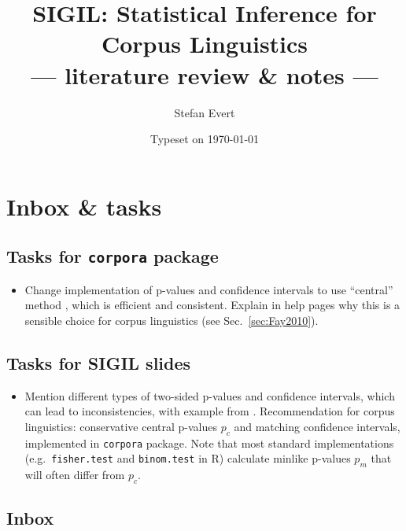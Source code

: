 \documentclass[a4paper]{article}
\title{SIGIL: Statistical Inference for Corpus Linguistics\\--- literature review \& notes ---}
\author{Stefan Evert}
\date{Typeset on \today}
\begin{document}
\maketitle

\listoftodos
\tableofcontents


\section{Inbox \& tasks}
\label{sec:inbox}

\subsection{Tasks for \texttt{corpora} package}
\label{sec:tasks-corpora}

\begin{itemize}
\item Change implementation of p-values and confidence intervals to use ``central'' method \citep[$p_c$, cf.][]{Fay:10a}, which is efficient and consistent.  Explain in help pages why this is a sensible choice for corpus linguistics (see Sec.~\ref{sec:Fay2010}).
\end{itemize}

\subsection{Tasks for SIGIL slides}
\label{sec:tasks-sigil}

\begin{itemize}
\item Mention different types of two-sided p-values and confidence intervals, which can lead to inconsistencies, with example from \citet{Fay:10a}.  Recommendation for corpus linguistics: conservative central p-values $p_c$ and matching confidence intervals, implemented in \texttt{corpora} package.  Note that most standard implementations (e.g.\ \texttt{fisher.test} and \texttt{binom.test} in R) calculate minlike p-values $p_m$ that will often differ from $p_c$.
\end{itemize}

\subsection{Inbox}
\label{sec:inbox}
\end{document}
